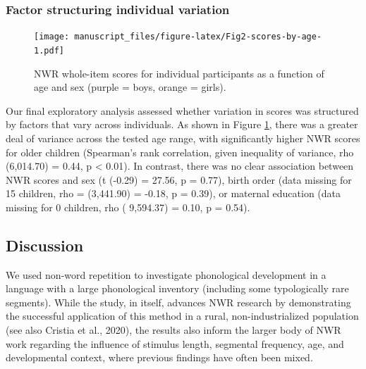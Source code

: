 \documentclass[english,,man,floatsintext]{apa6}
\begin{document}
\subsubsection{Factor structuring individual
variation}\label{factor-structuring-individual-variation}

\begin{figure}
\centering
\texttt{[image: manuscript\_files/figure-latex/Fig2-scores-by-age-1.pdf]}
\caption{\label{fig:Fig2-scores-by-age}NWR whole-item scores for individual
participants as a function of age and sex (purple = boys, orange =
girls).}
\end{figure}

Our final exploratory analysis assessed whether variation in scores was
structured by factors that vary across individuals. As shown in Figure
\ref{fig:Fig2-scores-by-age}, there was a greater deal of variance
across the tested age range, with significantly higher NWR scores for
older children (Spearman's rank correlation, given inequality of
variance, rho (6,014.70) = 0.44, p \textless{} 0.01). In contrast, there
was no clear association between NWR scores and sex (t (-0.29) = 27.56,
p = 0.77), birth order (data missing for 15 children, rho = (3,441.90) =
-0.18, p = 0.39), or maternal education (data missing for 0 children,
rho ( 9,594.37) = 0.10, p = 0.54).

\subsection{Discussion}\label{discussion}

We used non-word repetition to investigate phonological development in a
language with a large phonological inventory (including some
typologically rare segments). While the study, in itself, advances NWR
research by demonstrating the successful application of this method in a
rural, non-industrialized population (see also Cristia et al., 2020),
the results also inform the larger body of NWR work regarding the
influence of stimulus length, segmental frequency, age, and
developmental context, where previous findings have often been mixed.
\end{document}
